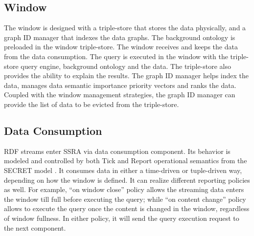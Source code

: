 %
\subsection{Window}
The window is designed with a triple-store that stores the data physically, and a graph ID manager that indexes the data graphs.
The background ontology is preloaded in the window triple-store.
The window receives and keeps the data from the data consumption.
The query is executed in the window with the triple-store query engine, background ontology and the data.
The triple-store also provides the ability to explain the results.
The graph ID manager helps index the data, manages data semantic importance priority vectors and ranks the data. 
Coupled with the window management strategies, the graph ID manager can provide the list of data to be evicted from the triple-store.
%
\subsection{Data Consumption}
RDF streams enter SSRA via data consumption component. 
Its behavior is modeled and controlled by both Tick and Report operational semantics from the SECRET model \cite{botan2010secret}.
It consumes data in either a time-driven or tuple-driven way, depending on how the window is defined. 
It can realize different reporting policies as well. 
For example, ``on window close'' policy allows the streaming data enters the window till full before executing the query; 
while ``on content change'' policy allows to execute the query once the content is changed in the window, regardless of window fullness. 
In either policy, it will send the query execution request to the next component.
%
